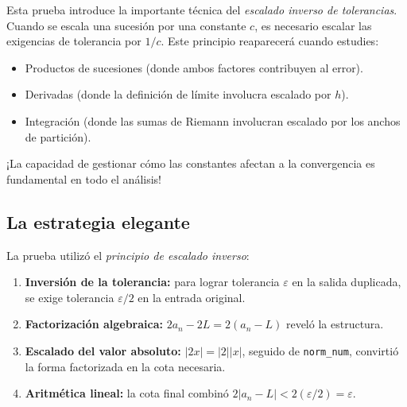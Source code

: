 Esta prueba introduce la importante técnica del \emph{escalado inverso de
tolerancias}. Cuando se escala una sucesión por una constante $c$, es necesario
escalar las exigencias de tolerancia por $1/c$. Este principio reaparecerá
cuando estudies:

\begin{itemize}
  \item Productos de sucesiones (donde ambos factores contribuyen al error).
  \item Derivadas (donde la definición de límite involucra escalado por $h$).
  \item Integración (donde las sumas de Riemann involucran escalado por los
        anchos de partición).
\end{itemize}

¡La capacidad de gestionar cómo las constantes afectan a la convergencia es
fundamental en todo el análisis!

\subsection{La estrategia elegante}

La prueba utilizó el \emph{principio de escalado inverso}:

\begin{enumerate}
  \item \textbf{Inversión de la tolerancia:} para lograr tolerancia $\varepsilon$
        en la salida duplicada, se exige tolerancia $\varepsilon/2$ en la
        entrada original.
  \item \textbf{Factorización algebraica:} $2a_n - 2L =
        2(a_n - L)$ reveló la estructura.
  \item \textbf{Escalado del valor absoluto:} $|2x| = |2||x|$,
        seguido de \texttt{norm\_num}, convirtió la forma factorizada en la
        cota necesaria.
  \item \textbf{Aritmética lineal:} la cota final combinó
        $2|a_n - L| < 2(\varepsilon/2) = \varepsilon$.
\end{enumerate}


